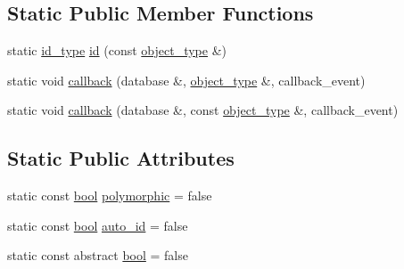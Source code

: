 \subsection*{Static Public Member Functions}
\begin{DoxyCompactItemize}
\item 
static \hyperlink{classodb_1_1access_1_1object__traits_3_01_1_1_graph_class_01_4_adf9a24fcdfb5c36b924d7f5a4b0d76df}{id\+\_\+type} \hyperlink{classodb_1_1access_1_1object__traits_3_01_1_1_graph_class_01_4_a99cc611c42a7947a9b9da569d584b079}{id} (const \hyperlink{classodb_1_1access_1_1object__traits_3_01_1_1_graph_class_01_4_a0808c9b0dc597786e3b5e11fc0f63e43}{object\+\_\+type} \&)
\item 
static void \hyperlink{classodb_1_1access_1_1object__traits_3_01_1_1_graph_class_01_4_ac30d61af43e1a0c4f2ef9fb4a32c4bf5}{callback} (database \&, \hyperlink{classodb_1_1access_1_1object__traits_3_01_1_1_graph_class_01_4_a0808c9b0dc597786e3b5e11fc0f63e43}{object\+\_\+type} \&, callback\+\_\+event)
\item 
static void \hyperlink{classodb_1_1access_1_1object__traits_3_01_1_1_graph_class_01_4_a5eada3a298ae9db33264152ee8047d08}{callback} (database \&, const \hyperlink{classodb_1_1access_1_1object__traits_3_01_1_1_graph_class_01_4_a0808c9b0dc597786e3b5e11fc0f63e43}{object\+\_\+type} \&, callback\+\_\+event)
\end{DoxyCompactItemize}
\subsection*{Static Public Attributes}
\begin{DoxyCompactItemize}
\item 
static const \hyperlink{classodb_1_1access_1_1object__traits_3_01_1_1_graph_class_01_4_adb6d76b31575782f2c201eb3ab510e59}{bool} \hyperlink{classodb_1_1access_1_1object__traits_3_01_1_1_graph_class_01_4_ab98d6ff3bbe77868e4728ec80a75e787}{polymorphic} = false
\item 
static const \hyperlink{classodb_1_1access_1_1object__traits_3_01_1_1_graph_class_01_4_adb6d76b31575782f2c201eb3ab510e59}{bool} \hyperlink{classodb_1_1access_1_1object__traits_3_01_1_1_graph_class_01_4_a6793f8d458eec718fc1d0becd111635a}{auto\+\_\+id} = false
\item 
static const abstract \hyperlink{classodb_1_1access_1_1object__traits_3_01_1_1_graph_class_01_4_adb6d76b31575782f2c201eb3ab510e59}{bool} = false
\end{DoxyCompactItemize}


